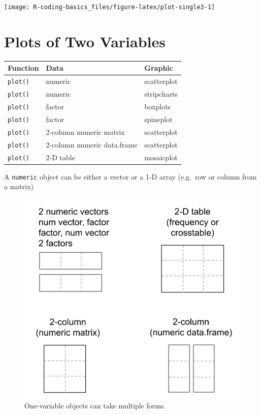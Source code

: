 \documentclass[
]{book}
\begin{document}
\begin{center}\texttt{[image: R-coding-basics\_files/figure-latex/plot-single3-1]} \end{center}

\hypertarget{plots-of-two-variables}{%
\section{Plots of Two Variables}\label{plots-of-two-variables}}

\begin{longtable}[]{@{}lll@{}}
\toprule()
Function & Data & Graphic \\
\midrule()
\endhead
\texttt{plot()} & numeric & scatterplot \\
\texttt{plot()} & numeric & stripcharts \\
\texttt{plot()} & factor & boxplots \\
\texttt{plot()} & factor & spineplot \\
\texttt{plot()} & 2-column numeric matrix & scatterplot \\
\texttt{plot()} & 2-column numeric data.frame & scatterplot \\
\texttt{plot()} & 2-D table & mosaicplot \\
\bottomrule()
\end{longtable}

A \texttt{numeric} object can be either a vector or a 1-D array (e.g.~row or column
from a matrix)

\begin{figure}

{\centering \includegraphics[width=0.6\linewidth]{images/plots/two_variable_objs} 

}

\caption{One-variable objects can take multiple forms.}\label{fig:unnamed-chunk-209}
\end{figure}
\end{document}
